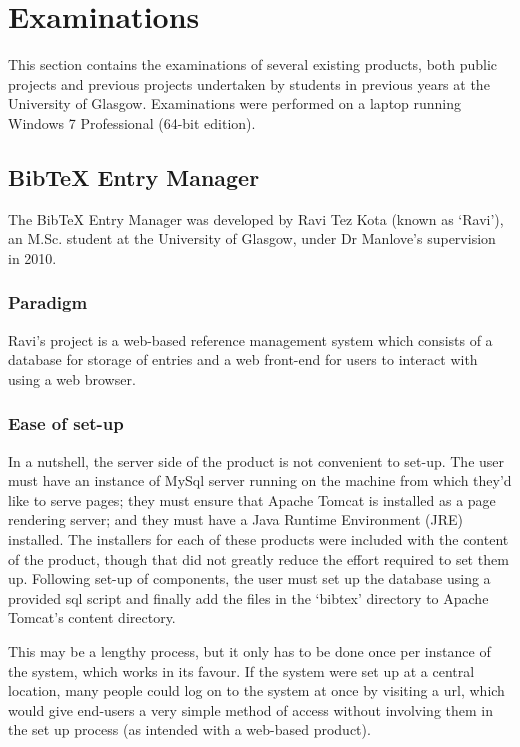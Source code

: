 \documentclass{l4proj}
\newcommand{\BibTeX}{B{\sc ib}\TeX}
\newcommand{\bibtex}{\BibTeX}
\begin{document}
\section{Examinations}
This section contains the examinations of several existing products, both public projects and previous projects undertaken by students in previous years at the University of Glasgow.  Examinations were performed on a laptop running Windows 7 Professional (64-bit edition).

\subsection{\bibtex{} Entry Manager}
The \bibtex{} Entry Manager was developed by Ravi Tez Kota (known as `Ravi'), an M.Sc. student at the University of Glasgow, under Dr Manlove's supervision in 2010.

\subsubsection{Paradigm}
Ravi's project is a web-based reference management system which consists of a database for storage of entries and a web front-end for users to interact with using a web browser.

\subsubsection{Ease of set-up}
In a nutshell, the server side of the product is not convenient to set-up.  The user must have an instance of MySql server running on the machine from which they'd like to serve pages; they must ensure that Apache Tomcat is installed as a page rendering server; and they must have a Java Runtime Environment (JRE) installed.  The installers for each of these products were included with the content of the product, though that did not greatly reduce the effort required to set them up.  Following set-up of components, the user must set up the database using a provided \gls{sql} script and finally add the files in the `bibtex' directory to Apache Tomcat's content directory.  

This may be a lengthy process, but it only has to be done once per instance of the system, which works in its favour. If the system were set up at a central location, many people could log on to the system at once by visiting a \gls{url}, which would give end-users a very simple method of access without involving them in the set up process (as intended with a web-based product).
\end{document}
